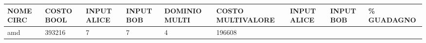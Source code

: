 \documentclass[italian,]{book}
\begin{document}
\begin{longtable}[]{@{}lllllllll@{}}
\toprule
\begin{minipage}[b]{0.07\columnwidth}\raggedright
NOME CIRC\strut
\end{minipage} & \begin{minipage}[b]{0.11\columnwidth}\raggedright
COSTO BOOL\strut
\end{minipage} & \begin{minipage}[b]{0.08\columnwidth}\raggedright
INPUT ALICE\strut
\end{minipage} & \begin{minipage}[b]{0.07\columnwidth}\raggedright
INPUT BOB\strut
\end{minipage} & \begin{minipage}[b]{0.09\columnwidth}\raggedright
DOMINIO MULTI\strut
\end{minipage} & \begin{minipage}[b]{0.12\columnwidth}\raggedright
COSTO MULTIVALORE\strut
\end{minipage} & \begin{minipage}[b]{0.08\columnwidth}\raggedright
INPUT ALICE\strut
\end{minipage} & \begin{minipage}[b]{0.07\columnwidth}\raggedright
INPUT BOB\strut
\end{minipage} & \begin{minipage}[b]{0.07\columnwidth}\raggedright
\% GUADAGNO\strut
\end{minipage}\tabularnewline
\midrule
\endhead
\begin{minipage}[t]{0.07\columnwidth}\raggedright
amd\strut
\end{minipage} & \begin{minipage}[t]{0.11\columnwidth}\raggedright
393216\strut
\end{minipage} & \begin{minipage}[t]{0.08\columnwidth}\raggedright
7\strut
\end{minipage} & \begin{minipage}[t]{0.07\columnwidth}\raggedright
7\strut
\end{minipage} & \begin{minipage}[t]{0.09\columnwidth}\raggedright
4\strut
\end{minipage} & \begin{minipage}[t]{0.12\columnwidth}\raggedright
196608\strut
\end{minipage} & \begin{minipage}[t]{0.08\columnwidth}\raggedright

\end{minipage}
\end{longtable}
\end{document}
